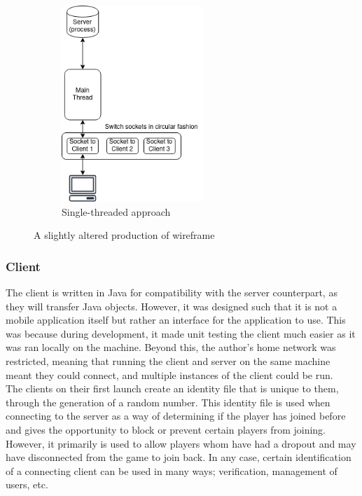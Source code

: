 \documentclass[11pt]{article}
\begin{document}
\begin{figure}[h]
{	\begin{subfigure}[h]{0.3\paperwidth}
	\hspace{10pt}
		\includegraphics[height=20em]{approach_single}
		\caption{Single-threaded approach}
	\end{subfigure}	
	}
	
	\caption{A slightly altered production of wireframe}
	
\end{figure}






\newpage
\subsubsection{Client}

The client is written in Java for compatibility with the server counterpart, as they will transfer Java objects. However, it was designed such that it is not a mobile application itself but rather an interface for the application to use. This was because during development, it made unit testing the client much easier as it was ran locally on the machine. Beyond this, the author's home network was restricted, meaning that running the client and server on the same machine meant they could connect, and multiple instances of the client could be run. \\

The clients on their first launch create an identity file that is unique to them, through the generation of a random number. This identity file is used when connecting to the server as a way of determining if the player has joined before and gives the opportunity to block or prevent certain players from joining. However, it primarily is used to allow players whom have had a dropout and may have disconnected from the game to join back. In any case, certain identification of a connecting client can be used in many ways; verification, management of users, etc. \\
\end{document}
